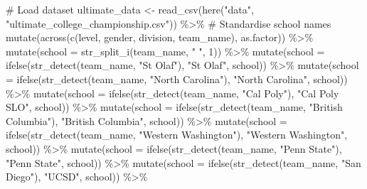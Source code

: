 \documentclass[
  letterpaper,
  DIV=11,
  numbers=noendperiod]{scrartcl}
\newenvironment{Shaded}{\begin{snugshade}}{\end{snugshade}}
\newcommand{\AttributeTok}[1]{\textcolor[rgb]{0.40,0.45,0.13}{#1}}
\newcommand{\CommentTok}[1]{\textcolor[rgb]{0.37,0.37,0.37}{#1}}
\newcommand{\DecValTok}[1]{\textcolor[rgb]{0.68,0.00,0.00}{#1}}
\newcommand{\FunctionTok}[1]{\textcolor[rgb]{0.28,0.35,0.67}{#1}}
\newcommand{\NormalTok}[1]{\textcolor[rgb]{0.00,0.23,0.31}{#1}}
\newcommand{\OtherTok}[1]{\textcolor[rgb]{0.00,0.23,0.31}{#1}}
\newcommand{\SpecialCharTok}[1]{\textcolor[rgb]{0.37,0.37,0.37}{#1}}
\newcommand{\StringTok}[1]{\textcolor[rgb]{0.13,0.47,0.30}{#1}}
\begin{document}
\begin{Shaded}
\begin{Highlighting}[]
\CommentTok{\# Load dataset}
\NormalTok{ultimate\_data }\OtherTok{\textless{}{-}} \FunctionTok{read\_csv}\NormalTok{(}\FunctionTok{here}\NormalTok{(}\StringTok{"data"}\NormalTok{, }\StringTok{"ultimate\_college\_championship.csv"}\NormalTok{)) }\SpecialCharTok{\%\textgreater{}\%}
\CommentTok{\# Standardise school names}
  \FunctionTok{mutate}\NormalTok{(}\FunctionTok{across}\NormalTok{(}\FunctionTok{c}\NormalTok{(level, gender, division, team\_name), as.factor)) }\SpecialCharTok{\%\textgreater{}\%}
  \FunctionTok{mutate}\NormalTok{(}\AttributeTok{school =} \FunctionTok{str\_split\_i}\NormalTok{(team\_name, }\StringTok{" "}\NormalTok{, }\DecValTok{1}\NormalTok{)) }\SpecialCharTok{\%\textgreater{}\%}
  \FunctionTok{mutate}\NormalTok{(}\AttributeTok{school =} \FunctionTok{ifelse}\NormalTok{(}\FunctionTok{str\_detect}\NormalTok{(team\_name, }\StringTok{"St Olaf"}\NormalTok{), }\StringTok{"St Olaf"}\NormalTok{, school)) }\SpecialCharTok{\%\textgreater{}\%}
  \FunctionTok{mutate}\NormalTok{(}\AttributeTok{school =} \FunctionTok{ifelse}\NormalTok{(}\FunctionTok{str\_detect}\NormalTok{(team\_name, }\StringTok{"North Carolina"}\NormalTok{), }\StringTok{"North Carolina"}\NormalTok{, school)) }\SpecialCharTok{\%\textgreater{}\%}
  \FunctionTok{mutate}\NormalTok{(}\AttributeTok{school =} \FunctionTok{ifelse}\NormalTok{(}\FunctionTok{str\_detect}\NormalTok{(team\_name, }\StringTok{"Cal Poly"}\NormalTok{), }\StringTok{"Cal Poly SLO"}\NormalTok{, school))  }\SpecialCharTok{\%\textgreater{}\%}
  \FunctionTok{mutate}\NormalTok{(}\AttributeTok{school =} \FunctionTok{ifelse}\NormalTok{(}\FunctionTok{str\_detect}\NormalTok{(team\_name, }\StringTok{"British Columbia"}\NormalTok{), }\StringTok{"British Columbia"}\NormalTok{, school))  }\SpecialCharTok{\%\textgreater{}\%}
  \FunctionTok{mutate}\NormalTok{(}\AttributeTok{school =} \FunctionTok{ifelse}\NormalTok{(}\FunctionTok{str\_detect}\NormalTok{(team\_name, }\StringTok{"Western Washington"}\NormalTok{), }\StringTok{"Western Washington"}\NormalTok{, school))  }\SpecialCharTok{\%\textgreater{}\%}
  \FunctionTok{mutate}\NormalTok{(}\AttributeTok{school =} \FunctionTok{ifelse}\NormalTok{(}\FunctionTok{str\_detect}\NormalTok{(team\_name, }\StringTok{"Penn State"}\NormalTok{), }\StringTok{"Penn State"}\NormalTok{, school))  }\SpecialCharTok{\%\textgreater{}\%}
  \FunctionTok{mutate}\NormalTok{(}\AttributeTok{school =} \FunctionTok{ifelse}\NormalTok{(}\FunctionTok{str\_detect}\NormalTok{(team\_name, }\StringTok{"San Diego"}\NormalTok{), }\StringTok{"UCSD"}\NormalTok{, school))  }\SpecialCharTok{\%\textgreater{}\%}

\end{Highlighting}
\end{Shaded}
\end{document}
